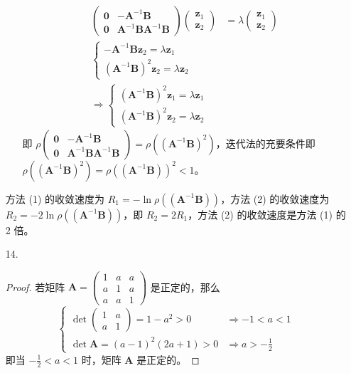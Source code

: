 \documentclass{sjtuarticle}
\begin{document}
\begin{itemize}
\begin{solution}
\begin{itemize}
            \begin{align*}
                \begin{pmatrix}
                    \bm{0} & -\bm{A}^{-1}\bm{B} \\ \bm{0} & \bm{A}^{-1}\bm{B}\bm{A}^{-1}\bm{B}
                \end{pmatrix}\begin{pmatrix}\bm{z}_1\\\bm{z}_2\end{pmatrix}&=\lambda\begin{pmatrix}\bm{z}_1\\\bm{z}_2\end{pmatrix}\\
                \begin{cases}
                    -\bm{A}^{-1}\bm{B}\bm{z}_2=\lambda\bm{z}_1\\
                    (\bm{A}^{-1}\bm{B})^2\bm{z}_2=\lambda\bm{z}_2
                \end{cases}\\
                \Rightarrow
                \begin{cases}
                    (\bm{A}^{-1}\bm{B})^2\bm{z}_1=\lambda\bm{z}_1\\
                    (\bm{A}^{-1}\bm{B})^2\bm{z}_2=\lambda\bm{z}_2
                \end{cases}
            \end{align*}
            即 $\rho \begin{pmatrix}
                \bm{0} & -\bm{A}^{-1}\bm{B} \\ \bm{0} & \bm{A}^{-1}\bm{B}\bm{A}^{-1}\bm{B}
            \end{pmatrix}=\rho((\bm{A}^{-1}\bm{B})^2)$，迭代法的充要条件即 $\rho((\bm{A}^{-1}\bm{B})^2)=\rho((\bm{A}^{-1}\bm{B}))^2<1$。
        \end{itemize}
        方法 (1) 的收敛速度为 $R_1=-\ln \rho ((\bm{A}^{-1}\bm{B}))$，方法 (2) 的收敛速度为 $R_2=-2\ln \rho((\bm{A}^{-1}\bm{B}))$，即 $R_2=2R_1$，方法 (2) 的收敛速度是方法 (1) 的 2 倍。
    \end{solution}
    \item[14.] \begin{proof}
        若矩阵 $\bm{A}=\begin{pmatrix}
            1 & a & a \\ a & 1 & a \\ a & a & 1
        \end{pmatrix}$ 是正定的，那么
        \begin{equation*}
            \begin{cases}
                \det \begin{pmatrix}
                    1 & a \\ a & 1
                \end{pmatrix}=1-a^2>0&\Rightarrow -1 < a < 1 \\
                \det \bm{A}= (a-1)^2(2a+1)> 0 &\Rightarrow a>-\frac{1}{2}
            \end{cases}
        \end{equation*}
        即当 $-\frac{1}{2}<a<1$ 时，矩阵 $\bm{A}$ 是正定的。


\end{proof}
\end{itemize}
\end{document}
